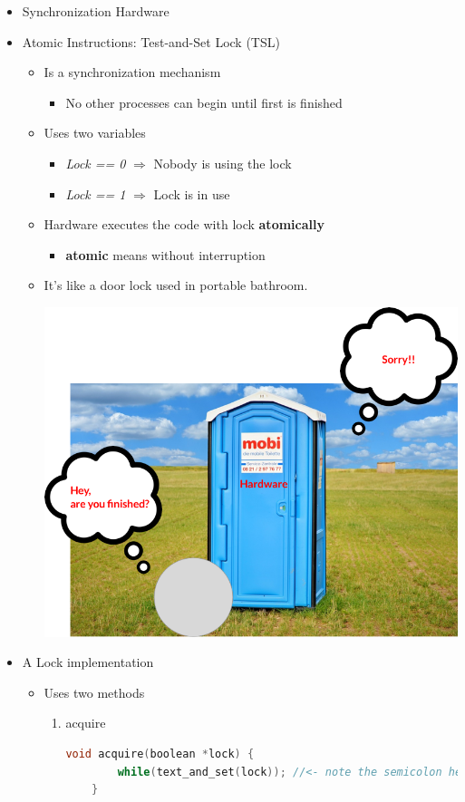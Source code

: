 \documentclass[12pt]{article}
\begin{document}
\begin{itemize}
    \item Synchronization Hardware
    \item Atomic Instructions: Test-and-Set Lock (TSL)
    \begin{itemize}
        \item Is a synchronization mechanism
        \begin{itemize}
            \item No other processes can begin until first is finished
        \end{itemize}
        \item Uses two variables
        \begin{itemize}
            \item \textit{Lock == 0} $\Rightarrow$ Nobody is using the lock
            \item \textit{Lock == 1} $\Rightarrow$ Lock is in use
        \end{itemize}
        \item Hardware executes the code with lock \textbf{atomically}
        \begin{itemize}
            \item \textbf{atomic} means without interruption
        \end{itemize}
        \item It's like a door lock used in portable bathroom.

        \begin{center}
        \includegraphics[width=0.8\linewidth]{images/week_2_notes_2_13.png}
        \end{center}

    \end{itemize}
    \item A Lock implementation
    \begin{itemize}
        \item Uses two methods
        \begin{enumerate}[1.]
            \item acquire
    \begin{lstlisting}[language=c]
    void acquire(boolean *lock) {
        while(text_and_set(lock)); //<- note the semicolon here :)
    }
    \end{lstlisting}


\end{enumerate}
\end{itemize}
\end{itemize}
\end{document}
